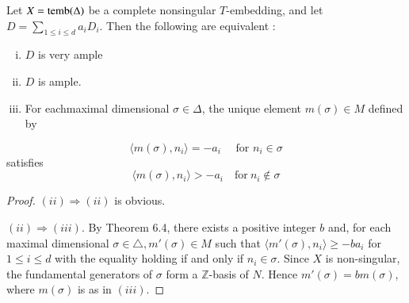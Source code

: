 \setcounter{coro}{4}
\begin{coro}[Demazure]\label{chap1:coro6.5} %
 Let $X = \operatorname{temb} (\Delta)$ be a complete nonsingular
$T$-embedding, and let $D =\sum\limits_{1 \leq i \leq d} a_{i}D_{i}
$. Then the following are equivalent :  
\begin{enumerate}[(i)]
\item $D$ is very ample

\item $D$ is ample.

\item For each\pageoriginale maximal dimensional $\sigma \in \Delta$,
  the unique element $m (\sigma) \in M$ defined by   
\end{enumerate}
$$
\langle m (\sigma) , n_{i}\rangle = -a_{i}\quad \text{  for   }  n_{i}
\in \sigma 
$$
satisfies  
$$
\langle m (\sigma) , n_{i}\rangle > -a_{i} \quad  \text{for} ~ n_{i}
\notin \sigma 
$$
\end{coro}

\begin{proof}
$(ii) \Rightarrow(ii)$ is obvious. 

\noindent
$(ii) \Rightarrow (iii)$. By Theorem 6.4, there exists a positive
integer $b$ and, for each maximal dimensional $\sigma \in \triangle,
m' (\sigma) \in M$ such that $\langle m' (\sigma), n_{i}\rangle \geq
-ba_{i}$ for $1 \leq i \leq d$ with the equality holding if and only
if $n_{i} \in \sigma$. Since $X$ is non-singular, the fundamental
generators of $\sigma$ form a $\mathbb{Z}$-basis of $N$. Hence $m'
(\sigma) = bm(\sigma)$, where $m (\sigma)$ is as in $(iii)$.  
\end{proof}

